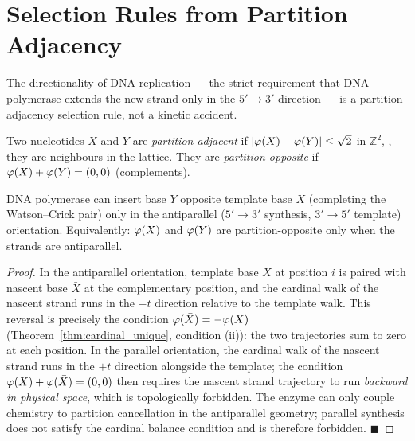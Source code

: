 \section{Selection Rules from Partition Adjacency}
\label{sec:selection_rules}

The directionality of DNA replication --- the strict requirement that DNA
polymerase extends the new strand only in the $5' \to 3'$ direction ---
is a partition adjacency selection rule, not a kinetic accident.

\begin{definition}
\label{def:partition_adjacency}
Two nucleotides $X$ and $Y$ are \emph{partition-adjacent} if
$|\varphi(X) - \varphi(Y)| \leq \sqrt{2}$ in $\mathbb{Z}^2$,
\ie, they are neighbours in the lattice. They are \emph{partition-opposite}
if $\varphi(X) + \varphi(Y) = (0,0)$ (complements).
\end{definition}

\begin{proposition}
\label{prop:direction_rule}
DNA polymerase can insert base $Y$ opposite template base $X$ (completing
the Watson--Crick pair) only in the antiparallel ($5'\to3'$ synthesis,
$3'\to5'$ template) orientation. Equivalently: $\varphi(X)$ and
$\varphi(Y)$ are partition-opposite only when the strands are antiparallel.
\end{proposition}

\begin{proof}
In the antiparallel orientation, template base $X$ at position $i$ is
paired with nascent base $\bar{X}$ at the complementary position, and
the cardinal walk of the nascent strand runs in the $-t$ direction
relative to the template walk. This reversal is precisely the condition
$\varphi(\bar{X}) = -\varphi(X)$ (Theorem~\ref{thm:cardinal_unique},
condition (ii)): the two trajectories sum to zero at each position.
In the parallel orientation, the cardinal walk of the nascent strand
runs in the $+t$ direction alongside the template; the condition
$\varphi(X) + \varphi(\bar{X}) = (0,0)$ then requires the nascent
strand trajectory to run \emph{backward in physical space}, which is
topologically forbidden. The enzyme can only couple chemistry to partition
cancellation in the antiparallel geometry; parallel synthesis does not
satisfy the cardinal balance condition and is therefore forbidden.
$\blacksquare$
\end{proof}

